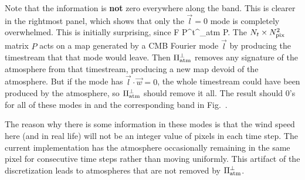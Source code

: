 Note that the information is {\bf not} zero everywhere along the band. This is clearer in the rightmost panel, which shows that only the $\vec l=0$ mode is completely overwhelmed. This is initially surprising, since
\be
F \propto P^t\Pi^\perp_{\rm atm} P.\ee
The $N_t\times N_{\rm pix}^2$ matrix $P$ acts on a map generated by a CMB Fourier mode $\vec l$ by producing the timestream that that mode would leave. Then $\Pi^\perp_{\rm atm}$ removes any signature of the atmosphere from that timestream, producing a new map devoid of the atmosphere. But if the mode has $\vec l\cdot \vec w=0$, the whole timestream could have been produced by the atmosphere, so $\Pi^\perp_{\rm atm}$ should remove it all. The result should 0's for all of these modes in  and the corresponding band in Fig.~. 

The reason why there is some information in these modes is that the wind speed here (and in real life) will not be an integer value of pixels in each time step. The current implementation has the atmosphere occasionally remaining in the same    
  pixel for consecutive time steps rather than moving uniformly. This artifact of the discretization leads to atmospheres that are not removed by $\Pi^\perp_{\rm atm}$.

%
%
%                                                                                                         
%  

%
                                                                                           


